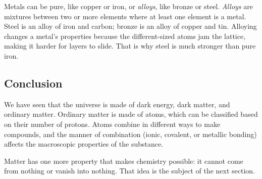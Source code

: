 Metals can be pure, like copper or iron, or \textit{alloys}, like bronze or steel. 
\textit{Alloys} are mixtures between two or more elements where at least one 
element is a metal. Steel is an alloy of iron and carbon; bronze is 
an alloy of copper and tin. Alloying changes a metal's properties because the different-sized atoms jam the lattice, making it harder for layers to slide. That is why steel is much stronger than pure iron. 

\subsection{Conclusion}
We have seen that the universe is made of dark energy, dark matter, and ordinary matter. Ordinary matter is made of atoms, which can be classified based on their number of protons. Atoms combine in different ways to make compounds, and the manner of combination (ionic, covalent, or metallic bonding) affects the macroscopic properties of the substance.

Matter has one more property that makes chemistry possible: it cannot come from nothing or vanish into nothing. That idea is the subject of the next section.














